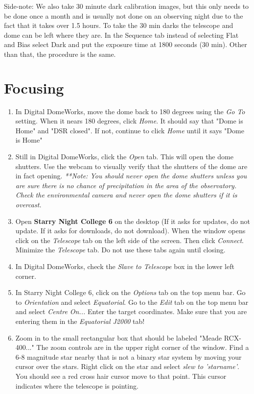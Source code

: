 \documentclass[11pt]{report}
\begin{document}
Side-note: We also take 30 minute dark calibration images, but this only needs to be done once a month and is usually not done on an observing night due to the fact that it takes over 1.5 hours. To take the 30 min darks the telescope and dome can be left where they are. In the Sequence tab instead of selecting Flat and Bias select Dark and put the exposure time at 1800 seconds (30 min). Other than that, the procedure is the same. 

\section{Focusing}

\begin{enumerate}
\item In Digital DomeWorks, move the dome back to 180 degrees using the \emph{Go To} setting. When it nears 180 degrees, click \emph{Home}. It should say that "Dome is Home" and "DSR closed". If not, continue to click \emph{Home} until it says "Dome is Home"
\item Still in Digital DomeWorks, click the \emph{Open} tab. This will open the dome shutters. Use the webcam to visually verify that the shutters of the dome are in fact opening. \emph{**Note: You should never open the dome shutters unless you are sure there is no chance of precipitation in the area of the observatory. Check the environmental camera and never open the dome shutters if it is overcast.}
\item Open {\bf Starry Night College 6} on the desktop (If it asks for updates, do not update. If it asks for downloads, do not download). When the window opens click on the \emph{Telescope} tab on the left side of the screen. Then click \emph{Connect}. Minimize the \emph{Telescope} tab. Do not use these tabs again until closing.
\item In Digital DomeWorks, check the \emph{Slave to Telescope} box in the lower left corner. 
\item In Starry Night College 6, click on the \emph{Options} tab on the top menu bar. Go to \emph{Orientation} and select \emph{Equatorial}. Go to the \emph{Edit} tab on the top menu bar and select \emph{Centre On...} Enter the target coordinates. Make sure that you are entering them in the \emph{Equatorial J2000} tab!
\item Zoom in to the small rectangular box that should be labeled "Meade RCX-400..." The zoom controls are in the upper right corner of the window. Find a 6-8 magnitude star nearby that is not a binary star system by moving your cursor over the stars. Right click on the star and select \emph{slew to 'starname'}. You should see a red cross hair cursor move to that point. This cursor indicates where the telescope is pointing. 

\end{enumerate}
\end{document}
